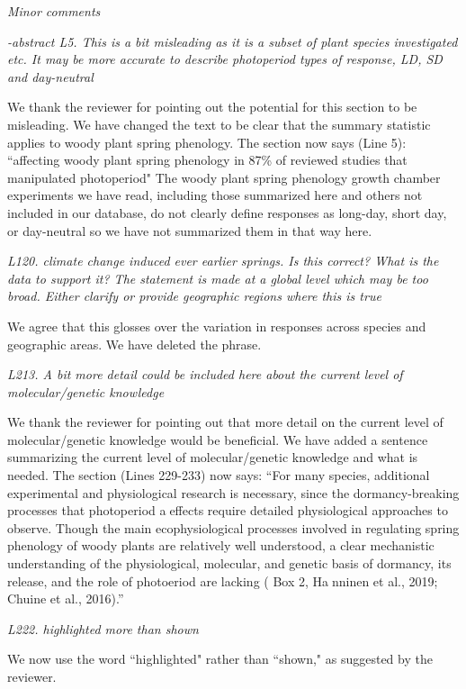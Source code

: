 \documentclass{article}
\begin{document}
\par \emph{Minor comments}
\par \emph{-abstract L5. This is a bit misleading as it is a subset of plant species investigated etc. It may be more accurate to describe photoperiod types of response, LD, SD and day-neutral}

\par We thank the reviewer for pointing out the potential for this section to be misleading. We have changed the text to be clear that the summary statistic applies to woody plant spring phenology. The section now says (Line 5): 
``affecting woody plant spring phenology in 87\% of reviewed studies that manipulated photoperiod"
The woody plant spring phenology growth chamber experiments we have read, including those summarized here and others not included in our database, do not clearly define responses as long-day, short day, or day-neutral so we have not summarized them in that way here. 
\par \emph{L120. climate change induced ever earlier springs. Is this correct? What is the data to support it? The statement is made at a global level which may be too broad. Either clarify or provide geographic regions where this is true}
\par We agree that this glosses over the variation in responses across species and geographic areas. We have deleted the phrase. 

\par \emph{L213. A bit more detail could be included here about the current level of molecular/genetic knowledge}
\par We thank the reviewer for pointing out that more detail on the current level of molecular/genetic knowledge would be beneficial. We have added a sentence summarizing the current level of molecular/genetic knowledge and what is needed. The section (Lines 229-233) now says:
``For many species, additional experimental and physiological research is necessary, since the dormancy-breaking processes that photoperiod aeffects require detailed physiological approaches to observe. Though the main ecophysiological processes involved in regulating spring phenology of woody plants are relatively well understood, a clear mechanistic understanding of the physiological, molecular, and genetic basis of dormancy, its release, and the role of photoeriod are lacking  ( Box 2, Hanninen et al., 2019; Chuine et al., 2016).''

\par \emph{L222. highlighted more than shown}
\par We now use the word ``highlighted" rather than ``shown," as suggested by the reviewer.
\end{document}

